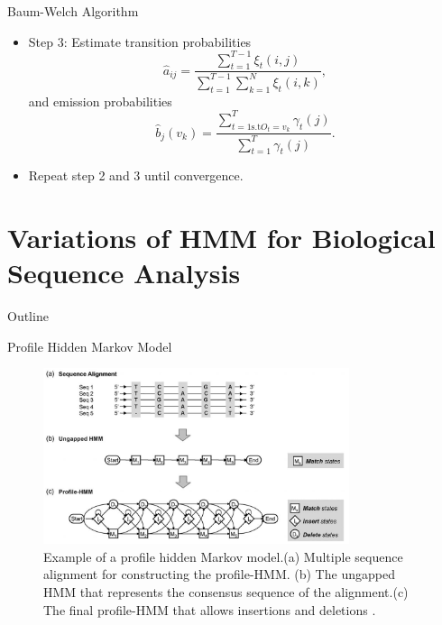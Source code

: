 \documentclass{beamer}
\begin{document}
\begin{frame}{Baum-Welch Algorithm}
	\begin{itemize}
		\item Step 3: Estimate transition probabilities
		\begin{equation}
			\hat{a}_{ij} = \frac{\sum_{t=1}^{T-1}\xi_t(i,j)}{\sum_{t=1}^{T-1}\sum_{k=1}^{N}\xi_t(i,k)},
		\end{equation}
		and emission probabilities
		\begin{equation}
			\hat{b}_j(v_k) = \frac{\sum_{t=1 \text{s.t} O_t = v_k}^T \gamma_t(j)}{\sum_{t=1}^{T}\gamma_t(j)}.
		\end{equation}
		\item Repeat step 2 and 3 until convergence.
	\end{itemize}
\end{frame}

\section{Variations of HMM for Biological Sequence Analysis}

\begin{frame}{Outline}
	\tableofcontents[currentsection]
\end{frame}

\begin{frame}{Profile Hidden Markov Model}
	\begin{figure}
	\centering
	\includegraphics[width = 0.8\textwidth]{profile.png}
	\caption{ Example of a profile hidden Markov model.(a) Multiple sequence alignment for constructing the profile-HMM. (b) The ungapped HMM that represents the consensus sequence of the alignment.(c) The final profile-HMM that allows insertions and deletions \cite{yoon2009hidden}.}
	\end{figure}
\end{frame}
\end{document}
